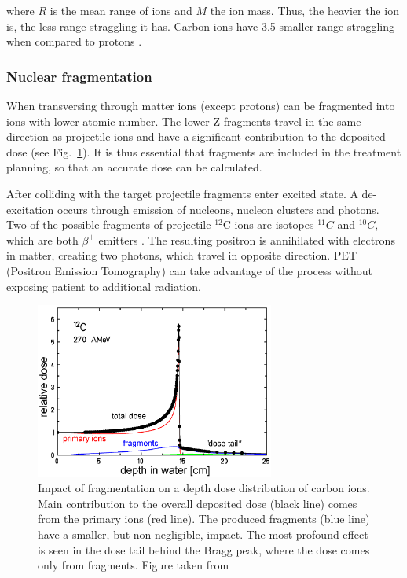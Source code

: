\documentclass[type=dr, dr=rernat, accentcolor=tud7b,colorbacktitle, bigchapter, openright, twoside, 12pt ]{tudthesis}
\begin{document}
where $R$ is the mean range of ions and $M$ the ion mass. Thus, the heavier the ion is, the less range straggling it has. Carbon ions have 3.5 smaller range straggling when compared to protons \cite{Schardt2010}.

\subsubsection{Nuclear fragmentation}
\label{nuclfrag}

When transversing through matter ions (except protons) can be fragmented into ions with lower atomic number. The lower Z fragments travel in the same direction as projectile ions and 
have a significant contribution to the deposited dose (see Fig.~\ref{iondd}). It is thus essential that fragments are included in the treatment planning, so that an accurate dose can be calculated.

After colliding with the target projectile fragments enter excited state. A de-excitation occurs through
emission of nucleons, nucleon clusters and photons. Two of the possible fragments of projectile $^{12}$C ions are isotopes $^{11}C$ and $^{10}C$, which are both $\beta^+$ emitters \cite{Kraft2000}.
The resulting positron is annihilated with electrons in matter, creating two photons, which travel in opposite direction. PET (Positron Emission Tomography) can take advantage of the process without exposing patient to additional radiation.

\begin{figure}[H]
\begin{center}
\includegraphics[width=0.7\textwidth]{./Images/iondepthdosesum.png}
\caption{Impact of fragmentation on a depth dose distribution of carbon ions. Main contribution to the overall deposited dose (black line) comes from the primary ions (red line). The produced fragments 
(blue line) have a smaller, but non-negligible, impact. The most profound effect is seen in the dose tail behind the Bragg peak, where the dose comes only from fragments. Figure taken from \cite{Groezinger2004}}
\label{iondd}
\end{center}
\end{figure}
\end{document}
